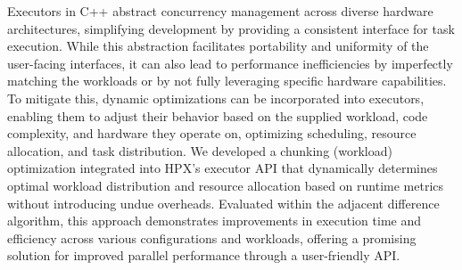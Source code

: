 Executors in C++ abstract concurrency management across diverse hardware architectures, simplifying development by providing a consistent interface for task execution. While this abstraction facilitates portability and uniformity of the user-facing interfaces, it can also lead to performance inefficiencies by imperfectly matching the workloads or by not fully leveraging specific hardware capabilities. To mitigate this, dynamic optimizations can be incorporated into executors, enabling them to adjust their behavior based on the supplied workload, code complexity, and hardware they operate on, optimizing scheduling, resource allocation, and task distribution. We developed a chunking (workload) optimization integrated into HPX’s executor API that dynamically determines optimal workload distribution and resource allocation based on runtime metrics without introducing undue overheads. Evaluated within the adjacent difference algorithm, this approach demonstrates improvements in execution time and efficiency across various configurations and workloads, offering a promising solution for improved parallel performance through a user-friendly API.
